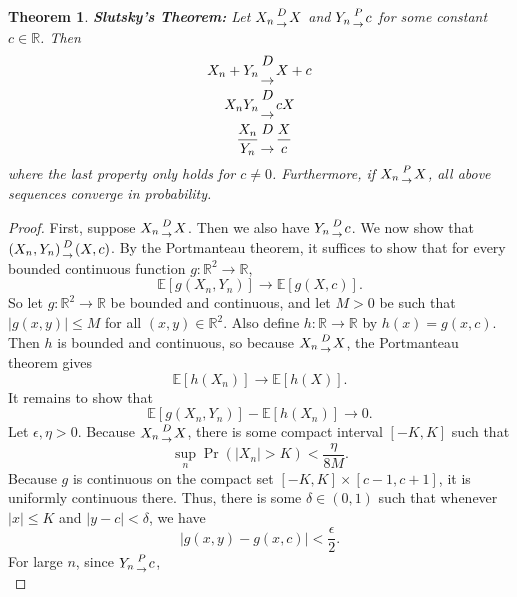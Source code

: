 \documentclass{article}
\newtheorem{theorem}{Theorem}
\theoremstyle{definition}\newtheorem{definition}{DEF}
\theoremstyle{definition}\newtheorem{example}{Ex}
\theoremstyle{lemma}\newtheorem{lemma}{Lemma}
\theoremstyle{corrolary}\newtheorem{corrolary}{Cor}
\begin{document}
\begin{theorem}
\textbf{Slutsky's Theorem:}
Let $X_n {D \atop \rightarrow} X$ and $Y_n {P \atop \rightarrow} c$ for some constant $c\in \mathbb{R}$.
Then
\begin{align}
X_n + Y_n &{D \atop \rightarrow} X +c\\
X_n Y_n &{D \atop \rightarrow} cX\\
\frac{X_n}{Y_n} &{D \atop \rightarrow} \frac{X}{c} 
\end{align}
where the last property only holds for $c\neq 0$.
Furthermore, if $X_n {P \atop \rightarrow} X$, all above sequences converge in probability.
\end{theorem}
\begin{proof}
First, suppose $X_n {D \atop \rightarrow} X$.
Then we also have $Y_n {D \atop \rightarrow} c$.
We now show that $(X_n, Y_n) {D \atop \rightarrow} (X, c)$.
By the Portmanteau theorem, it suffices to show that for every bounded continuous function $g:\mathbb{R}^2\rightarrow \mathbb{R}$,
\begin{equation*}
\mathbb{E}[g(X_n, Y_n)]\rightarrow \mathbb{E}[g(X,c)].
\end{equation*}
So let $g:\mathbb{R}^2\rightarrow \mathbb{R}$ be bounded and continuous, and let $M>0$ be such that $|g(x,y)|\leq M$ for all $(x,y)\in \mathbb{R}^2$.
Also define $h:\mathbb{R}\rightarrow \mathbb{R}$ by $h(x)=g(x,c)$.
Then $h$ is bounded and continuous, so because $X_n {D \atop \rightarrow} X$, the Portmanteau theorem gives
\begin{equation*}
\mathbb{E}[h(X_n)]\rightarrow \mathbb{E}[h(X)].
\end{equation*}
It remains to show that
\begin{equation*}
\mathbb{E}[g(X_n, Y_n)]-\mathbb{E}[h(X_n)]\rightarrow 0.
\end{equation*}
Let $\epsilon, \eta>0$.
Because $X_n {D \atop \rightarrow} X$, there is some compact interval $[-K,K]$ such that
\begin{equation*}
\sup_n \Pr(|X_n|>K)<\frac{\eta}{8M}.
\end{equation*}
Because $g$ is continuous on the compact set $[-K,K]\times [c-1,c+1]$, it is uniformly continuous there.
Thus, there is some $\delta\in (0,1)$ such that whenever $|x|\leq K$ and $|y-c|<\delta$, we have
\begin{equation*}
|g(x,y)-g(x,c)|<\frac{\epsilon}{2}.
\end{equation*}
For large $n$, since $Y_n {P \atop \rightarrow} c$,
\begin{equation*}

\end{equation*}
\end{proof}
\end{document}
